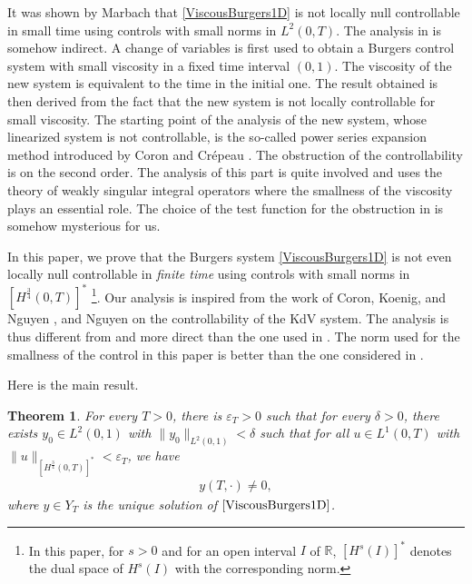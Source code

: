 \documentclass[11pt, reqno]{amsart}
\theoremstyle{plain}
\newtheorem{theorem}[thm]{Theorem}
\numberwithin{equation}{section}
\newcommand{\mR}{\mathbb{R}}
\begin{document}
\medskip 
It was shown by Marbach \cite{Marbach18} that \eqref{ViscousBurgers1D} is not locally null controllable in small time using controls with small norms in $L^2(0, T)$. The analysis in \cite{Marbach18} is somehow indirect.  
A change of variables is first used to obtain a Burgers control system with small viscosity in a fixed time interval $(0, 1)$. The viscosity of the new system is equivalent to the time in the initial one. The result obtained is then derived from the fact that the new system is not locally controllable for small viscosity. The starting point of the analysis of the new system, whose linearized system is not controllable, is the so-called power series expansion method introduced by Coron and Cr\'epeau \cite{Coron-Crepeau}. The obstruction of the controllability is on the second order.  The analysis of this part is quite involved and uses the theory of weakly singular integral operators where the smallness of the viscosity plays an essential role. The choice of the test function for the obstruction in \cite{Marbach18} is somehow mysterious for us.

\medskip 
In this paper, we prove that the Burgers system \eqref{ViscousBurgers1D} is not even locally null controllable in {\it finite time} using controls with small norms in $[H^{\frac{3}{4}}(0, T)]^*$ \footnote{In this paper, for $s > 0$ and for an open interval $I$ of $\mR$,  $[H^s(I)]^*$ denotes the dual space of $H^s(I)$ with the corresponding norm.}. Our analysis is inspired from the work of Coron, Koenig, and Nguyen \cite{Coron-Koenig-Nguyen}, and Nguyen \cite{Nguyen} on the controllability of the KdV system. The analysis is thus different from and more direct than the one used in \cite{Marbach18}. The norm used for the smallness of the control in this paper is better than the one considered in \cite{Marbach18}.  

\medskip 
Here is the main result. 

 \begin{theorem}    \label{Mainresult}
       For every $T > 0$, there is $\varepsilon_T > 0$ such that for every $\delta > 0$, there exists $y_0 \in L^2(0, 1)$ with {$\|y_0\|_{L^2(0, 1)} < \delta$} such that for all $u \in L^1(0, T)$ with $\|u\|_{[H^{\frac{3}{4}}(0, T)]^*} < \varepsilon_T$, we have
            \begin{align*}
                y(T, \cdot) \neq 0,
            \end{align*}
            where $y \in {{Y}_T}$ is the unique solution of $\eqref{ViscousBurgers1D}$.
    \end{theorem}
\end{document}
